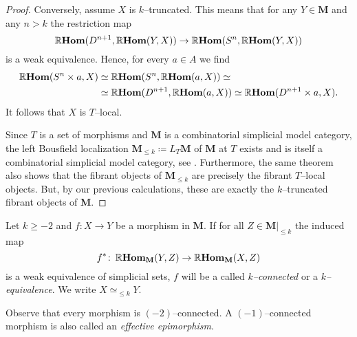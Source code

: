 \begin{proof}
  Conversely, assume \(X\) is \(k\)--truncated. This means that for
  any \(Y\in\mathbf{M}\) and any \(n>k\) the restriction map
  \[
  \operatorname{\mathbb{R}\textnormal{\bfseries Hom}}(D^{n+1}, \operatorname{\mathbb{R}\textnormal{\bfseries Hom}}(Y,X)) \to \operatorname{\mathbb{R}\textnormal{\bfseries Hom}}(S^{n}, \operatorname{\mathbb{R}\textnormal{\bfseries Hom}}(Y,X))
  \]
  is a weak equivalence. Hence, for every \(a\in A\) we find
  \begin{align*}
    \operatorname{\mathbb{R}\textnormal{\bfseries Hom}}(S^{n}\times a, X) &\simeq \operatorname{\mathbb{R}\textnormal{\bfseries Hom}}(S^{n}, \operatorname{\mathbb{R}\textnormal{\bfseries Hom}}(a, X))\simeq \\
    &\simeq \operatorname{\mathbb{R}\textnormal{\bfseries Hom}}(D^{n+1}, \operatorname{\mathbb{R}\textnormal{\bfseries Hom}}(a, X))\simeq \operatorname{\mathbb{R}\textnormal{\bfseries Hom}}(D^{n+1}\times a, X).
  \end{align*}
  It follows that \(X\) is \(T\)--local.

  Since \(T\) is a set of morphisms and \(\mathbf{M}\) is a
  combinatorial simplicial model category, the left Bousfield
  localization \(\mathbf{M}_{\leq k} \coloneqq L_{T}\mathbf{M}\) of
  \(\mathbf{M}\) at \(T\) exists and is itself a combinatorial
  simplicial model category, see
  \cite[Prop.~A.3.7.3]{mr2522659}. Furthermore, the same theorem also
  shows that the fibrant objects of \(\mathbf{M}_{\leq k}\) are
  precisely the fibrant \(T\)--local objects. But, by our previous
  calculations, these are exactly the \(k\)--truncated fibrant objects
  of \(\mathbf{M}\).
\end{proof}

\begin{definition}
  Let \(k\geq -2\) and \(f\colon X\to Y\) be a morphism in \(\mathbf
  M\). If for all \(Z\in\mathbf M|_{\leq k}\) the induced map
  \[f^{*}\colon \operatorname{\mathbb{R}\textnormal{\bfseries Hom}}_{\mathbf M}(Y, Z) \to \operatorname{\mathbb{R}\textnormal{\bfseries Hom}}_{\mathbf M}(X, Z)\]
  is a weak equivalence of simplicial sets, \(f\) will be a called
  \emph{\(k\)--connected} or a \emph{\(k\)--equivalence}. We write
  \(X\simeq_{\leq k} Y\).
\end{definition}

\begin{remark}
  Observe that every morphism is \((-2)\)--connected. A
  \((-1)\)--connected morphism is also called an \emph{effective
    epimorphism}.
\end{remark}


